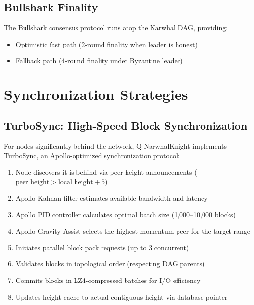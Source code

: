 \documentclass[11pt,a4paper]{article}
\begin{document}
\subsection{Bullshark Finality}

The Bullshark consensus protocol \cite{bullshark} runs atop the Narwhal DAG, providing:
\begin{itemize}
    \item Optimistic fast path (2-round finality when leader is honest)
    \item Fallback path (4-round finality under Byzantine leader)
\end{itemize}

\section{Synchronization Strategies}

\subsection{TurboSync: High-Speed Block Synchronization}

For nodes significantly behind the network, Q-NarwhalKnight implements TurboSync, an Apollo-optimized synchronization protocol:

\begin{enumerate}
    \item Node discovers it is behind via peer height announcements ($\text{peer\_height} > \text{local\_height} + 5$)
    \item Apollo Kalman filter estimates available bandwidth and latency
    \item Apollo PID controller calculates optimal batch size (1,000--10,000 blocks)
    \item Apollo Gravity Assist selects the highest-momentum peer for the target range
    \item Initiates parallel block pack requests (up to 3 concurrent)
    \item Validates blocks in topological order (respecting DAG parents)
    \item Commits blocks in LZ4-compressed batches for I/O efficiency
    \item Updates height cache to actual contiguous height via database pointer
\end{enumerate}
\end{document}
